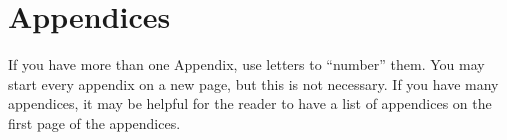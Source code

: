 
\section{Appendices}\label{ap:appendices}
If you have more than one Appendix, use letters to ``number'' them.
You may start every appendix on a new page, but this is not necessary.
If you have many appendices, it may be helpful for the reader to have a list of appendices on the first page of the appendices.